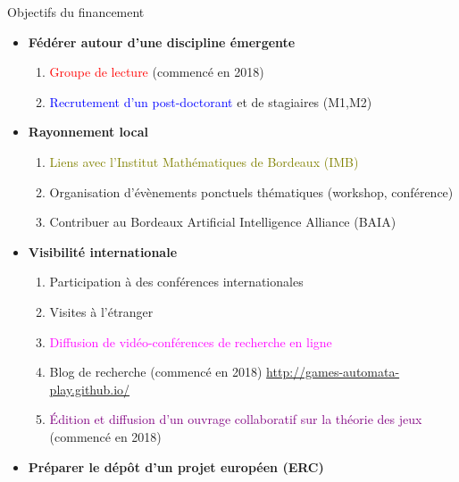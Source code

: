\documentclass[svgnames]{beamer}
\begin{document}
\begin{frame}{Objectifs du financement}
\begin{itemize}
	\item \textbf{F{\'e}d{\'e}rer autour d'une discipline {\'e}mergente}
	\begin{enumerate}
		\item \textcolor{red}{Groupe de lecture} (commenc{\'e} en 2018)
		\item \textcolor{blue}{Recrutement d'un post-doctorant} et de stagiaires (M1,M2)
	\end{enumerate}

	\item \textbf{Rayonnement local}
	\begin{enumerate}
		\item \textcolor{olive}{Liens avec l'Institut Math{\'e}matiques de Bordeaux (IMB)}
		\item Organisation d'{\'e}v{\`e}nements ponctuels th{\'e}matiques (workshop, conf{\'e}rence)
		\item Contribuer au Bordeaux Artificial Intelligence Alliance (BAIA)
	\end{enumerate}

	\item \textbf{Visibilit{\'e} internationale}
	\begin{enumerate}
		\item Participation {\`a} des conf{\'e}rences internationales
		\item Visites {\`a} l'{\'e}tranger
		\item \textcolor{magenta}{Diffusion de vid{\'e}o-conf{\'e}rences de recherche en ligne}
		\item Blog de recherche (commenc{\'e} en 2018) \url{http://games-automata-play.github.io/}
		\item \textcolor{purple}{{\'E}dition et diffusion d'un ouvrage collaboratif sur la th{\'e}orie des jeux} (commenc{\'e} en 2018)
	\end{enumerate}

	\item \textbf{Pr{\'e}parer le d{\'e}p{\^o}t d'un projet europ{\'e}en (ERC)}
\end{itemize}
\end{frame}

\appendix
\end{document}
